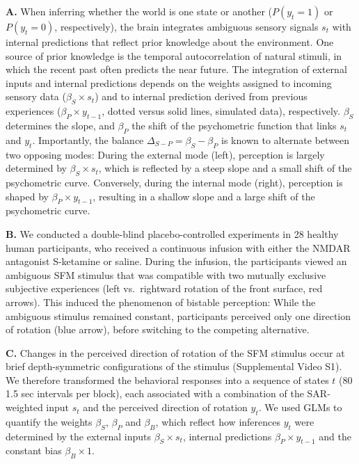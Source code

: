 \documentclass[
]{article}
\begin{document}
\textbf{A.} When inferring whether the world is one state or another
(\(P(y_t = 1)\) or \(P(y_t = 0)\), respectively), the brain integrates
ambiguous sensory signals \(s_t\) with internal predictions that reflect
prior knowledge about the environment. One source of prior knowledge is
the temporal autocorrelation of natural stimuli, in which the recent
past often predicts the near future. The integration of external inputs
and internal predictions depends on the weights assigned to incoming
sensory data (\(\beta_S \times s_t\)) and to internal prediction derived
from previous experiences (\(\beta_P \times y_{t-1}\), dotted versus
solid lines, simulated data), respectively. \(\beta_S\) determines the
slope, and \(\beta_P\) the shift of the psychometric function that links
\(s_t\) and \(y_t\). Importantly, the balance
\(\Delta_{S-P} = \beta_S - \beta_P\) is known to alternate between two
opposing modes: During the external mode (left), perception is largely
determined by \(\beta_S \times s_t\), which is reflected by a steep
slope and a small shift of the psychometric curve. Conversely, during
the internal mode (right), perception is shaped by
\(\beta_P \times y_{t-1}\), resulting in a shallow slope and a large
shift of the psychometric curve.

\textbf{B.} We conducted a double-blind placebo-controlled experiments
in 28 healthy human participants, who received a continuous infusion
with either the NMDAR antagonist S-ketamine or saline. During the
infusion, the participants viewed an ambiguous SFM stimulus that was
compatible with two mutually exclusive subjective experiences (left
vs.~rightward rotation of the front surface, red arrows). This induced
the phenomenon of bistable perception: While the ambiguous stimulus
remained constant, participants perceived only one direction of rotation
(blue arrow), before switching to the competing alternative.

\textbf{C.} Changes in the perceived direction of rotation of the SFM
stimulus occur at brief depth-symmetric configurations of the stimulus
(Supplemental Video S1). We therefore transformed the behavioral
responses into a sequence of states \(t\) (80 1.5 sec intervals per
block), each associated with a combination of the SAR-weighted input
\(s_t\) and the perceived direction of rotation \(y_t\). We used GLMs to
quantify the weights \(\beta_S\), \(\beta_P\) and \(\beta_B\), which
reflect how inferences \(y_t\) were determined by the external inputs
\(\beta_S \times s_t\), internal predictions \(\beta_P \times y_{t-1}\)
and the constant bias \(\beta_B \times 1\).
\end{document}
